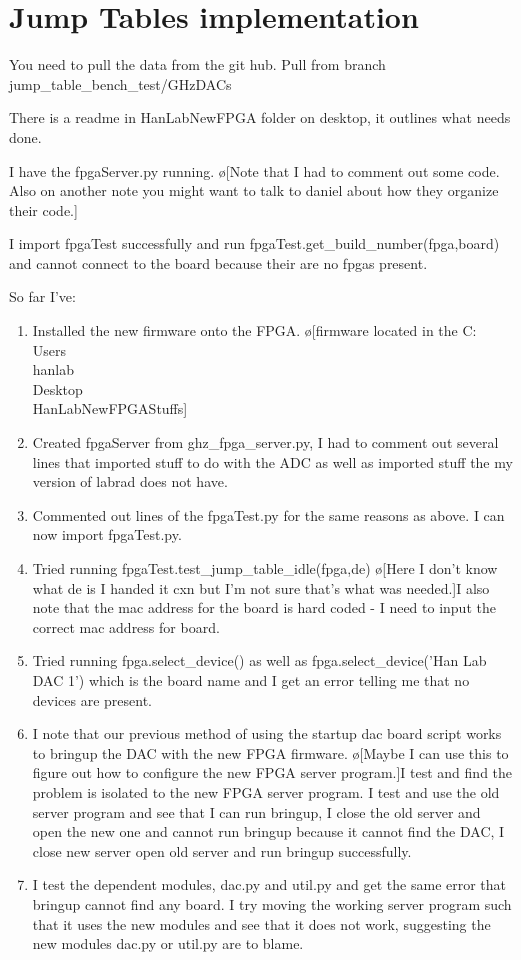 \documentclass[10pt]{book}
\begin{document}
\section{Jump Tables implementation}
You need to pull the data from the git hub. Pull from branch jump\_table\_bench\_test/GHzDACs

There is a readme in HanLabNewFPGA folder on desktop, it outlines what needs done.

I have the fpgaServer.py running. \o[Note that I had to comment out some code. Also on another note you might want to talk to daniel about how they organize their code.]{}

I import fpgaTest successfully and run fpgaTest.get\_build\_number(fpga,board) and cannot connect to the board because their are no fpgas present.

So far I've:
\begin{enumerate}
    \item Installed the new firmware onto the FPGA. \o[firmware located in the C:\\Users\\hanlab\\Desktop\\HanLabNewFPGAStuffs]{}
    \item Created fpgaServer from ghz\_fpga\_server.py, I had to comment out several lines that imported stuff to do with the ADC as well as imported stuff the my version of labrad does not have.
    \item Commented out lines of the fpgaTest.py for the same reasons as above. I can now import fpgaTest.py.
    \item Tried running fpgaTest.test\_jump\_table\_idle(fpga,de) \o[Here I don't know what de is I handed it cxn but I'm not sure that's what was needed.]{I also note that the mac address for the board is hard coded - I need to input the correct mac address for board.}
    \item Tried running fpga.select\_device() as well as fpga.select\_device('Han Lab DAC 1') which is the board name and I get an error telling me that no devices are present.
    \item I note that our previous method of using the startup dac board script works to bringup the DAC with the new FPGA firmware. \o[Maybe I can use this to figure out how to configure the new FPGA server program.]{I test and find the problem is isolated to the new FPGA server program. I test and use the old server program and see that I can run bringup, I close the old server and open the new one and cannot run bringup because it cannot find the DAC, I close new server open old server and run bringup successfully.}
    \item I test the dependent modules, dac.py and util.py and get the same error that bringup cannot find any board. I try moving the working server program such that it uses the new modules and see that it does not work, suggesting the new modules dac.py or util.py are to blame.
\end{enumerate}
\end{document}
